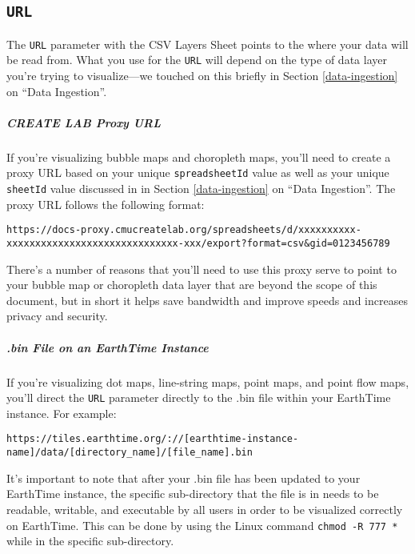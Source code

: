 \documentclass[
]{krantz}
\begin{document}
\hypertarget{url}{%
\subsection*{\texorpdfstring{\texttt{URL}}{URL}}\label{url}}


The \texttt{URL} parameter with the CSV Layers Sheet points to the where your data will be read from. What you use for the \texttt{URL} will depend on the type of data layer you're trying to visualize---we touched on this briefly in Section \ref{data-ingestion} on ``Data Ingestion''.

\hypertarget{create-lab-proxy-url}{%
\subparagraph*{CREATE LAB Proxy URL}\label{create-lab-proxy-url}}

If you're visualizing bubble maps and choropleth maps, you'll need to create a proxy URL based on your unique \texttt{spreadsheetId} value as well as your unique \texttt{sheetId} value discussed in in Section \ref{data-ingestion} on ``Data Ingestion''. The proxy URL follows the following format:

\texttt{https://docs-proxy.cmucreatelab.org/spreadsheets/d/xxxxxxxxxx-xxxxxxxxxxxxxxxxxxxxxxxxxxxxxx-xxx/export?format=csv\&gid=0123456789}

There's a number of reasons that you'll need to use this proxy serve to point to your bubble map or choropleth data layer that are beyond the scope of this document, but in short it helps save bandwidth and improve speeds and increases privacy and security.

\hypertarget{bin-file-on-an-earthtime-instance}{%
\subparagraph*{.bin File on an EarthTime Instance}\label{bin-file-on-an-earthtime-instance}}

If you're visualizing dot maps, line-string maps, point maps, and point flow maps, you'll direct the \texttt{URL} parameter directly to the .bin file within your EarthTime instance. For example:

\texttt{https://tiles.earthtime.org/://{[}earthtime-instance-name{]}/data/{[}directory\_name{]}/{[}file\_name{]}.bin}

It's important to note that after your .bin file has been updated to your EarthTime instance, the specific sub-directory that the file is in needs to be readable, writable, and executable by all users in order to be visualized correctly on EarthTime. This can be done by using the Linux command \texttt{chmod\ -R\ 777\ *} while in the specific sub-directory.
\end{document}
